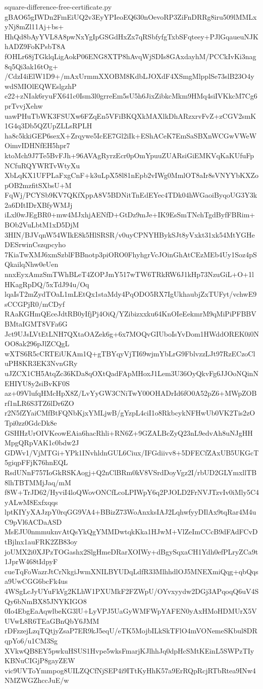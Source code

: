 \documentclass[11pt]{article}
\theoremstyle{definition}
\theoremstyle{remark}
\begin{document}
\begin{filecontents*}[overwrite]{square-difference-free-certificate.py}
gBAO65gIWDn2FmEiUQ2v3EyYPIeoEQ630nOevoRP3ZiFnDRRg8iru509lMMLxyNj8mZl11Aj+bs+
HhQd8bAyYVL8A8pwNxYgIpGSGdHxZx7qRSbfyfgTxbSFqteey+PJlGqaueuNJKhADZ9FoKPsbT8A
fOHLr68jTGklqLigAokP06ENG8XTP8hAvqWjSDIs8GAxdayhM/PCCkIvKi3nag8q5Qi3ak16tOg+
/CdzI4iElW1D9+/mAxUrmmXXOBM8KdbLJOXdF4XSmgMlpplSe73slB23O4ywdSMIOlEQWEslgzhP
e22+zNIak6ryuFX641c0Ism3l0grreEm5sU5h6JixZibkcMkm9HMq4siIVKkcM7Cg6prTvvjXehw
uawPHuTbWK3FSUXw6FZqEn5VFiBKQXkMAXlkDhARzxrvFvZ+zCGV2smK1G4q3Db5QZUpZLLsRPLH
ha8c5kkiGEP6sexX+Zrqywe5IcEE7Gl2iIk+EShACeK7EmSaSBXnWCGwVWeWOimvIDHNfEH5hpr7
ktoMch9J7Te5BvFJh+96AVAgRyrzEcr0pOmYpuuZUARsiGiEMKVqKaKUfuFpNCfuRQYWRTvWtyXu
XbLqKX1UFPLaFxgCnF+k3uLpX58l81nEpb2vIWg0MmlOT8aIr8sVNYYbKXZopOB2mzfitSXbsU+M
FqWj/PCYSb9KV7QKfXppA8V5BDNitTnEdEYec4TDk04hWGaoiByqoUG3Y3k2a6DItIDrXBfyWMJj
iLxl0wJEgBR0+mw4MJxhjAENfD+GtDz9mJe+IK9EsSmTNchTgdByfFBRim+BOb2VuLbtM1xD5DjM
3HIN/BJVqnW54WIkE8k5HlSRSR/v0uyCPNYHBykSJt8yVxkt31xk54MtYGHeDESrwinCszqpcyho
7KiaTwXMJ6xmSzblFBBnotp3piORO0FhyhgrVcJOinGhAtCEzMEb4Uy1Soz4pSQkailqNhw0eUen
nnxEyxAmzSmTWhBLeT4ZOPJmY517wTW6TRkRW6J1kHp73NzuGiL+O+1lHKagRpDQ/5xTdJ94u/Oq
lqaIsT2mZydTOaL1mLEtQx1staMdy4PqODO5RX7IgUkhaubjZxTUFyt/vchwE9sCCGPjR0/mCDyf
RAaKGHmQEceJdtRB0yIfjPj4OiQ/YZibizxxku64KnOIeEekmrM9qMiPiPFBBVBMtaIGMT8VFa6G
Jct9UJsLVtEtLNH7QXtaOAZek6g+6x7MOQvGIUboIsYvDom1HWddOREK0i0NOO8ak296pJlZCQgL
wXTS6R5cCRTEiUKAm1Q+gTBYqyVjTI69wjmYbLrG9FblvzzLJt97RzECzoCluPH8KR3EK3NvnGRy
uJZCX1CH5AtqZc36KDa8qOXtQadFApMHoxJ1Lem3U36OyQkvFg6JJOoNQinNEHIYU8y2siBvKF0S
az+09VlufqHMcHpX8Z/LvYyGW3CNiTwY00OHADrId6fO0A52pZ6+MWpZOBrf1nLR6S3TZ6lDr6ZO
r2N5fZYaiCMfBtFQNbKjxYMLjwB/gYzpL4ciI1o8RkbcykNFHwUb0VK2Tis2zOTpi0zz0GdcDk8e
GSHHzUrOIVKeowEAia6hacRhli+RN6Z+9GZALBcZyQ23nL9edvAh8uNJgHHMpgQRpVAK1c0bdw2J
GDWv1/VjMTGi+YPk1INvhldnGUL6Ciux/IFGdiivv8+5DFECfZAxUB5UKGcT5giqpFFjK76hnEQL
RsdUNnF757IoGkRSKAogj+Q2nClBRm0kV8VSrdDoyVgz2I/rbUD2GLYmxllTB8lhTBTMMjJaq/mM
f8W+TrJD62/HyviI4loQWovONCfLcoLPIWpY6q2PJOLD2FrNVJTzvIv0iMly5C4yALwM8Exfxqqs
lptKIYyXAJzpY0rqGG9VA4+BBizZ73WoAnxksIAJ2LqhwfyyDIlAx9tqRar4M4uC9pVl6ACDaASD
MsEJU0nmmuknvAtQsYkQgYMMDwtqkKka1HJwM+VlZeImCCcB9dFAdFCvDtBjlnx1auFRK2ZB83oy
joUMX2i0XJPzTOGashx2SlgHmeDRarXOIWy+dBgySqxaCH1Ydh0efPLryZCa9t1JprW468tIdpyF
cueTqFoWazrJtCrNkgiJwmXNILBYUDqLdfR33MlhhdlOJ5MNEXmiQqg+qbQqsa9UwCGG6bcFk4us
4WSgLcJyUYuFkVg2KLhW1PXUMkF2FZWpU/OYvxyydw2DGj3APqoqQ6uV4SQy6bNmBX85JNYKIGO8
0Io4EbgEaAqwlbeKG3lU+LyVPJ5UaGyWMFWpYAFEN0yAxHMoHDMUrX5VUVwL8R6TEaGBnQbY6JMM
rDFzzejLzqTQtjyZsaP7ER9kJ5eqU/eTK5MojbILkSkTFlO4mVONemeSKbul8DRqpYo6/u1CM3Sg
XVkwQB8EY5pwkuHSUS1Hvpe5wksFmarjKJlhhJq0dpHcSMtKEinL5SWPzTIyKBNuCIGjP8gayZEW
vic9UVToYmmpog8UILZQCfNjSEP4i9ITtKyHhK57a9ErRQpRcjRTbRtea9INw4NMZWGZhccJuE/w

\end{filecontents*}
\end{document}
